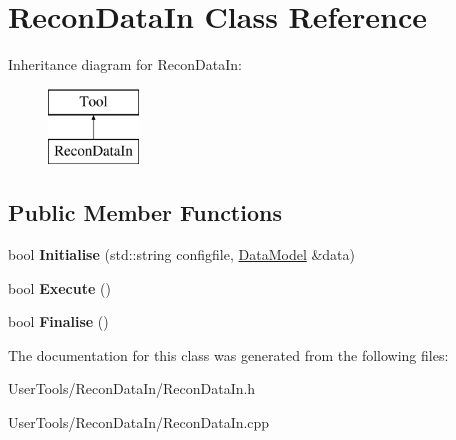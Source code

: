 \hypertarget{classReconDataIn}{\section{Recon\-Data\-In Class Reference}
\label{classReconDataIn}
}
Inheritance diagram for Recon\-Data\-In\-:\begin{figure}[H]
\begin{center}
\leavevmode
\includegraphics[height=2.000000cm]{classReconDataIn}
\end{center}
\end{figure}
\subsection*{Public Member Functions}
\begin{DoxyCompactItemize}
\item 
\hypertarget{classReconDataIn_a6f79d79fbeeeeade6f5eac8168fcce48}{bool {\bfseries Initialise} (std\-::string configfile, \hyperlink{classDataModel}{Data\-Model} \&data)}\label{classReconDataIn_a6f79d79fbeeeeade6f5eac8168fcce48}

\item 
\hypertarget{classReconDataIn_a54462fd9d4309f25a5a504bbc2ebeefb}{bool {\bfseries Execute} ()}\label{classReconDataIn_a54462fd9d4309f25a5a504bbc2ebeefb}

\item 
\hypertarget{classReconDataIn_abc3026b2188e32436d37d461f702809a}{bool {\bfseries Finalise} ()}\label{classReconDataIn_abc3026b2188e32436d37d461f702809a}

\end{DoxyCompactItemize}


The documentation for this class was generated from the following files\-:\begin{DoxyCompactItemize}
\item 
User\-Tools/\-Recon\-Data\-In/Recon\-Data\-In.\-h\item 
User\-Tools/\-Recon\-Data\-In/Recon\-Data\-In.\-cpp\end{DoxyCompactItemize}
